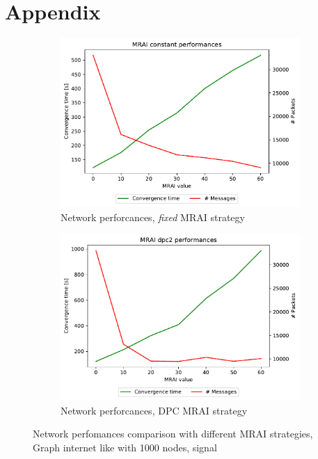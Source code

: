 \chapter{Appendix}
\label{cha:appendx}

\begin{figure}[h]
     \centering
     \begin{subfigure}[b]{0.45\textwidth}
         \centering
         \includegraphics[width=\textwidth]{images/internet_like/1000/signals/AWAW/constant/internet_like-constant_AWAW_mrai_evolution.pdf}
		 \caption{Network perforcances, \textit{fixed} \ac{MRAI} strategy}
         \label{fig:internet_like_1000_fixed_AWAW}
     \end{subfigure}
     \hfill
     \begin{subfigure}[b]{0.45\textwidth}
         \centering
         \includegraphics[width=\textwidth]{images/internet_like/1000/signals/AWAW/dpc/internet_like-DPC_AWAW_mrai_evolution.pdf}
		 \caption{Network perforcances, \ac{DPC} \ac{MRAI} strategy}
         \label{fig:internet_like_1000_dpc_AWAW}
     \end{subfigure}
	 \caption{Network perfomances comparison with different \ac{MRAI} strategies,
		Graph internet like with \num{1000} nodes, signal }
        \label{fig:internt_like_1000_evolution_AWAW}
\end{figure}

